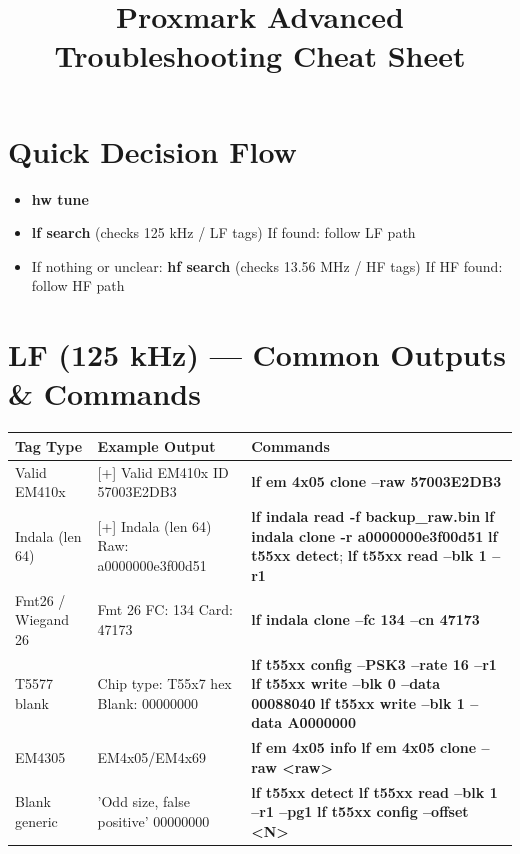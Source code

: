 \documentclass[a4paper,12pt]{article}
\begin{document}
\title{Proxmark Advanced Troubleshooting Cheat Sheet}
\author{}
\date{}
\maketitle

\section*{Quick Decision Flow}
\begin{itemize}
    \item \textbf{hw tune}
    \item \textbf{lf search} (checks 125 kHz / LF tags) \newline If found: follow LF path
    \item If nothing or unclear: \textbf{hf search} (checks 13.56 MHz / HF tags) \newline If HF found: follow HF path
\end{itemize}

\section*{LF (125 kHz) — Common Outputs \& Commands}
\begin{center}
\begin{tabular}{p{4cm} p{6cm} p{5cm}}
\toprule
\textbf{Tag Type} & \textbf{Example Output} & \textbf{Commands} \\
\midrule
Valid EM410x & \large{[+] Valid EM410x ID 57003E2DB3} & \textbf{lf em 4x05 clone --raw 57003E2DB3} \\
Indala (len 64) & \large{[+] Indala (len 64) Raw: a0000000e3f00d51} & \textbf{lf indala read -f backup_raw.bin} \newline \textbf{lf indala clone -r a0000000e3f00d51} \newline \textbf{lf t55xx detect}; \textbf{lf t55xx read --blk 1 --r1} \\
Fmt26 / Wiegand 26 & \large{Fmt 26 FC: 134 Card: 47173} & \textbf{lf indala clone --fc 134 --cn 47173} \\
T5577 blank & \large{Chip type: T55x7} \newline \large{hex Blank: 00000000} & \textbf{lf t55xx config --PSK3 --rate 16 --r1} \newline \textbf{lf t55xx write --blk 0 --data 00088040} \newline \textbf{lf t55xx write --blk 1 --data A0000000} \\
EM4305 & \large{EM4x05/EM4x69} & \textbf{lf em 4x05 info} \newline \textbf{lf em 4x05 clone --raw <raw>} \\
Blank generic & \large{'Odd size, false positive'} \newline \large{00000000} & \textbf{lf t55xx detect} \newline \textbf{lf t55xx read --blk 1 --r1 --pg1} \newline \textbf{lf t55xx config --offset <N>} \\
\bottomrule
\end{tabular}
\end{center}
\end{document}
